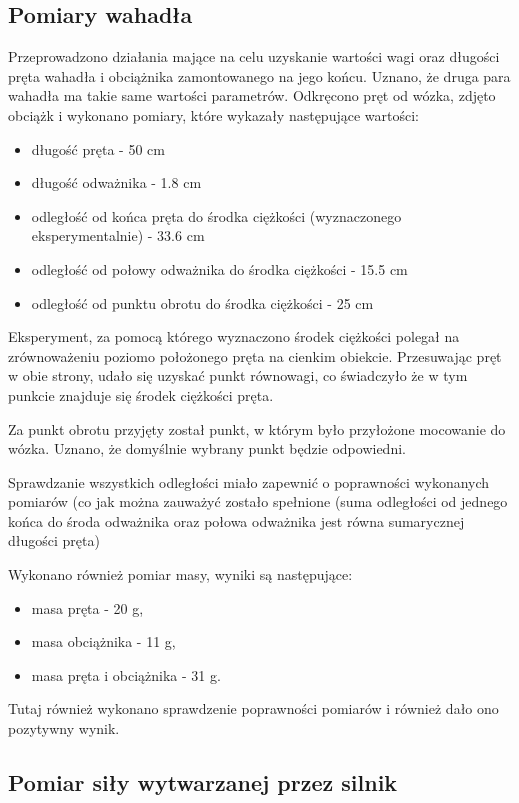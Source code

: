 \documentclass[12pt]{article}
\numberwithin{equation}{section}
\begin{document}
\subsection{Pomiary wahadła}

Przeprowadzono działania mające na celu uzyskanie wartości wagi oraz długości pręta wahadła i obciążnika zamontowanego na jego końcu. Uznano, że druga para wahadła ma takie same wartości parametrów. Odkręcono pręt od wózka, zdjęto obciążk i wykonano pomiary, które wykazały następujące wartości:

\begin{itemize}
    \item długość pręta - 50 cm
    \item długość odważnika - 1.8 cm
    \item odległość od końca pręta do środka ciężkości (wyznaczonego eksperymentalnie) - 33.6 cm
    \item odległość od połowy odważnika do środka ciężkości - 15.5 cm
    \item odległość od punktu obrotu do środka ciężkości - 25 cm
\end{itemize}

Eksperyment, za pomocą którego wyznaczono środek ciężkości polegał na zrównoważeniu poziomo położonego pręta na cienkim obiekcie. Przesuwając pręt w obie strony, udało się uzyskać punkt równowagi, co świadczyło że w tym punkcie znajduje się środek ciężkości pręta.

Za punkt obrotu przyjęty został punkt, w którym było przyłożone mocowanie do wózka. Uznano, że domyślnie wybrany punkt będzie odpowiedni.

Sprawdzanie wszystkich odległości miało zapewnić o poprawności wykonanych pomiarów (co jak można zauważyć zostało spełnione (suma odległości od jednego końca do środa odważnika oraz połowa odważnika jest równa sumarycznej długości pręta)

Wykonano również pomiar masy, wyniki są następujące:
\begin{itemize}
    \item masa pręta - 20 g,
    \item masa obciążnika - 11 g,
    \item masa pręta i obciążnika - 31 g.
\end{itemize}

Tutaj również wykonano sprawdzenie poprawności pomiarów i również dało ono pozytywny wynik.

\subsection{Pomiar siły wytwarzanej przez silnik}\label{subsec:sila_silnik}
\end{document}
